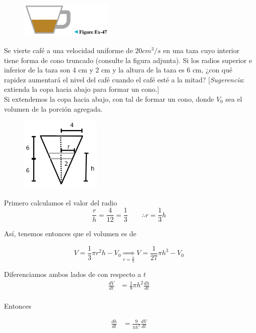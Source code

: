 \documentclass[12pt]{article}
\begin{document}
\begin{figure}[H]
\centering
\includegraphics[width=0.4\textwidth]{../img/img_Lista3/47.png}
\end{figure}
Se vierte café a una velocidad uniforme de $20 cm^3/s$ en una taza cuyo interior tiene forma de cono truncado (consulte la figura adjunta). Si los radios superior e inferior de la taza son 4 cm y 2 cm y la altura de la taza es 6 cm, ¿con qué rapidez aumentará el nivel del café cuando el café esté a la mitad? [\textit{Sugerencia}: extienda la copa hacia abajo para formar un cono.]\\

Si extendemos la copa hacia abajo, con tal de formar un cono, donde $V_0$ sea el volumen de la porción agregada.

\begin{figure}[H]
\centering
\includegraphics[width=0.35\textwidth]{../img/img_Lista3/cono.png}
\end{figure}

Primero calculamos el valor del radio
\[
\frac{r}{h}=\frac{4}{12}=\frac{1}{3}\qquad \therefore r=\frac{1}{3}h
\]

Así, tenemos entonces que el volumen es de

\[
V=\frac{1}{3}\pi r^2h-V_0 \underset{r=\frac{h}{3}}{\Longrightarrow} V=\frac{1}{27}\pi h^3-V_0
\]

Diferenciamos ambos lados de con respecto a $t$
\begin{align*}
  \frac{dV}{dt}
  &=\frac{1}{9}\pi h^2 \frac{dh}{dt}\\
\end{align*}

Entonces

\begin{align*}
  \frac{dh}{dt}
  &= \frac{9}{\pi h^2}\frac{dV}{dt}\\
\end{align*}
\end{document}
